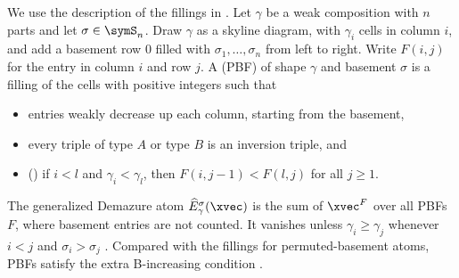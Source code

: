 We use the description of the fillings in \cite[Sect.~2]{RemmelTiefenbruck2013}.
Let $\gamma$ be a weak composition with $n$ parts and let $\sigma\in\symS_n$.
Draw $\gamma$ as a skyline diagram, with $\gamma_i$ cells in column $i$,
and add a basement row $0$ filled with $\sigma_1,\dotsc,\sigma_n$
from left to right.  Write $F(i,j)$ for the entry in column $i$ and row $j$.
A \label{permutedBasementFillingHMR} (PBF)
of shape $\gamma$ and basement $\sigma$ is a filling of the cells with
positive integers such that
\begin{itemize}
\item entries weakly decrease up each column, starting from the basement,
\item every triple of type $A$ or type $B$ is an inversion triple, and
\item () if $i<l$ and $\gamma_i<\gamma_l$, then
  $F(i,j-1)<F(l,j)$ for all $j\geq 1$.
\end{itemize}
The generalized Demazure atom $\widehat{E}^{\sigma}_\gamma(\xvec)$ is the sum
of $\xvec^{F}$ over all PBFs $F$, where basement entries are not counted.
It vanishes unless $\gamma_i\geq\gamma_j$ whenever $i<j$ and
$\sigma_i>\sigma_j$ \cite[Sect.~2]{RemmelTiefenbruck2013}.
Compared with the fillings for permuted-basement atoms, PBFs satisfy the
extra B-increasing condition \cite[Rem.~24]{Alexandersson2015gbMacdonald}.

